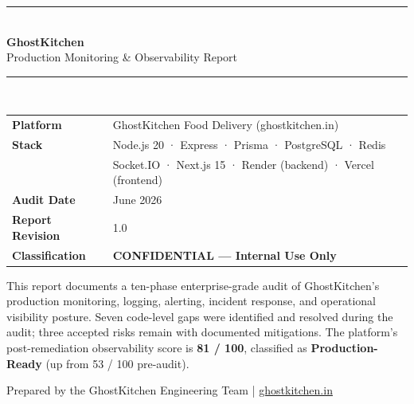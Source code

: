 \documentclass[12pt,a4paper]{article}
\begin{document}
\begin{titlepage}
  \centering
  \vspace*{2cm}
  {\color{brand}\rule{\linewidth}{4pt}}\\[0.4cm]
  {\Huge\bfseries GhostKitchen}\\[0.2cm]
  {\LARGE\color{muted} Production Monitoring \& Observability Report}\\[0.4cm]
  {\color{brand}\rule{\linewidth}{4pt}}\\[2cm]

  \begin{tabular}{ll}
    \textbf{Platform}         & GhostKitchen Food Delivery (ghostkitchen.in) \\[4pt]
    \textbf{Stack}            & Node.js 20 · Express · Prisma · PostgreSQL · Redis \\
                              & Socket.IO · Next.js 15 · Render (backend) · Vercel (frontend) \\[4pt]
    \textbf{Audit Date}       & June 2026 \\[4pt]
    \textbf{Report Revision}  & 1.0 \\[4pt]
    \textbf{Classification}   & \textbf{\color{crit}CONFIDENTIAL — Internal Use Only} \\
  \end{tabular}

  \vfill
  \begin{tcolorbox}[colback=brand!8,colframe=brand,title=Executive Summary,fonttitle=\bfseries\large]
    This report documents a ten-phase enterprise-grade audit of GhostKitchen's
    production monitoring, logging, alerting, incident response, and operational
    visibility posture.  Seven code-level gaps were identified and resolved during
    the audit; three accepted risks remain with documented mitigations.
    The platform's post-remediation observability score is \textbf{81 / 100},
    classified as \textbf{Production-Ready} (up from 53 / 100 pre-audit).
  \end{tcolorbox}

  \vspace{1cm}
  {\small\color{muted} Prepared by the GhostKitchen Engineering Team \quad|\quad
  \href{https://ghostkitchen.in}{ghostkitchen.in}}
\end{titlepage}

\newpage
\tableofcontents
\newpage

\end{document}
